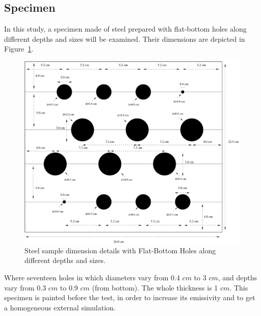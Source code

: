 \documentclass[]{spie}  %
\begin{document}
\subsection{Specimen} %
\label{sub:specimen}
In this study, a specimen made of steel prepared with flat-bottom holes along different depths and sizes will be examined. Their dimensions are depicted in Figure~\ref{specimen}.
   \begin{figure}[ht]
   \centering   
   \includegraphics[scale=0.4]{graph/specimen_schema.pdf}
   \caption{Steel sample dimension details with Flat-Bottom Holes along different depths and sizes.}
    \label{specimen} 
   \end{figure}  

Where seventeen holes in which diameters vary from 0.4 $cm$  to 3 $cm$, and depths vary from 0.3 $cm$ to 0.9 $cm$ (from bottom). The whole thickness is 1 $cm$. This specimen is painted before the test, in order to increase its emissivity and to get a homogeneous external simulation.

\end{document}
